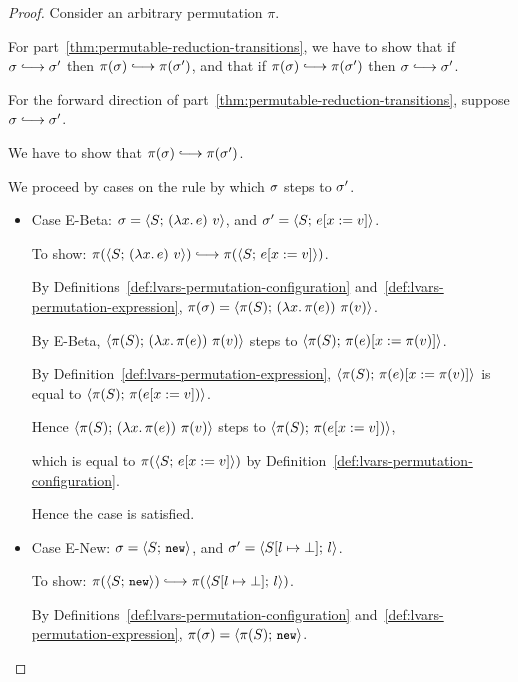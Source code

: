 \begin{proof}
  Consider an arbitrary permutation $\pi$.

  For part~\ref{thm:permutable-reduction-transitions}, we have to show
  that if $\conf \parstepsto \conf'$ then $\pi(\conf) \parstepsto
  \pi(\conf')$, and that if $\pi(\conf) \parstepsto \pi(\conf')$ then
  $\conf \parstepsto \conf'$.

  For the forward direction of
  part~\ref{thm:permutable-reduction-transitions}, suppose $\conf
  \parstepsto \conf'$.

  We have to show that $\pi(\conf) \parstepsto \pi(\conf')$.

  We proceed by cases on the rule by which $\sigma$ steps to $\sigma'$.

  \begin{itemize}
    \item Case {\sc E-Beta}: $\sigma =
      \langle S;\, (\lambda x.\,e)~v \rangle$, and $\sigma' =
      \langle S;\, e[x := v] \rangle$.

      To show: $\pi(\config{S}{\app{(\lam{x}{e})}{v}}) \parstepsto
      \pi(\config{S}{\subst{e}{x}{v}})$.

      By Definitions~\ref{def:lvars-permutation-configuration}
      and~\ref{def:lvars-permutation-expression}, $\pi(\sigma) =
      \langle \pi(S);\, (\lambda x.\,\pi(e))~\pi(v) \rangle$.

      By {\sc E-Beta},
      $\langle \pi(S);\, (\lambda x.\,\pi(e))~\pi(v) \rangle$ steps to
      $\langle \pi(S);\, \pi(e)[x := \pi(v)] \rangle$.

      By Definition~\ref{def:lvars-permutation-expression},
      $\langle \pi(S);\, \pi(e)[x := \pi(v)] \rangle$ is equal to
      $\langle \pi(S);\, \pi(e[x := v]) \rangle$.

      Hence $\langle \pi(S);\, (\lambda x.\,\pi(e))~\pi(v) \rangle$ steps
      to $\langle \pi(S);\, \pi(e[x := v]) \rangle$,

      which is equal to $\pi(\langle S;\, e[x := v] \rangle)$ by
      Definition~\ref{def:lvars-permutation-configuration}.

      Hence the case is satisfied.

    \item Case {\sc E-New}: $\sigma = \langle S;\, \mbox{\small{\texttt{new}}} \rangle$, and $\sigma' =
      \langle S[l \mapsto \bot];\, l \rangle$.

      To show: $\pi(\config{S}{\NEW}) \parstepsto
      \pi(\config{\extSRaw{S}{l}{\bot}}{l})$.

      By Definitions~\ref{def:lvars-permutation-configuration}
      and~\ref{def:lvars-permutation-expression}, $\pi(\sigma) =
      \langle \pi(S);\, \mbox{\small{\texttt{new}}} \rangle$.


\end{itemize}
\end{proof}
